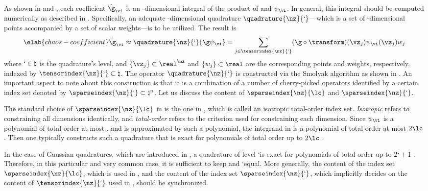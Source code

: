 As shown in  and , each
coefficient $\hat{\g}_{\vi}$ is an \nz-dimensional integral of the product of \g
and $\psi_{\vi}$. In general, this integral should be computed numerically as
described in . Specifically, an adequate
\nz-dimensional quadrature $\quadrature{\nz}{\lq}$---which is a set of
\nz-dimensional points accompanied by a set of scalar weights---is to be
utilized. The result is
\begin{equation} \elab{chaos-coefficient}
  \hat{\g}_{\vi} \approx \quadrature{\nz}{\lq}{\g \psi_{\vi}}
  = \sum_{j \in \tensorindex{\nz}{\lq}} (\g \circ \transform)(\vz_j) \psi_{\vi}(\vz_j) w_j
\end{equation}
where $\lq \in \natural$ is the quadrature's level, and $\{ \vz_j \} \subset
\real^\nz$ and $\{ w_j  \} \subset \real$ are the corresponding points and
weights, respectively, indexed by $\tensorindex{\nz}{\lq} \subset \natural$. The
operator $\quadrature{\nz}{\lq}$ is constructed via the Smolyak algorithm
\cite{smolyak1963} as shown in . An important aspect to
note about this construction is that it is a combination of a number of
cherry-picked operators identified by a certain index set denoted by
$\sparseindex{\nz}{\lq} \subset \natural^n$. Let us discuss the content of
$\sparseindex{\nz}{\lc}$ and $\sparseindex{\nz}{\lq}$.

The standard choice of $\sparseindex{\nz}{\lc}$ in  is the
one in , which is called an isotropic
total-order index set. \emph{Isotropic} refers to constraining all dimensions
identically, and \emph{total-order} refers to the criterion used for
constraining each dimension. Since $\psi_{\vi}$ is a polynomial of total order
at most \lc, and \g is approximated by such a polynomial, the integrand in
 is a polynomial of total order at most $2 \lc$. Then
one typically constructs such a quadrature that is exact for polynomials of
total order up to $2 \lc$ \cite{eldred2008}.

In the case of Gaussian quadratures, which are introduced in
, a quadrature of level \lq is exact for polynomials of
total order up to $2 \lq + 1$ \cite{heiss2008}. Therefore, in this particular
and very common case, it is sufficient to keep \lc and \lq equal. More
generally, the content of the index set $\sparseindex{\nz}{\lc}$, which is used
in , and the content of the index set
$\sparseindex{\nz}{\lq}$, which implicitly decides on the content of
$\tensorindex{\nz}{\lq}$ used in , should be
synchronized.

